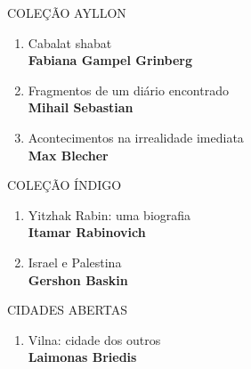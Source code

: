 \pagebreak
\pagestyle{empty}

\begingroup
\fontsize{7}{8}%

\scriptsize
{\formular\large{COLEÇÃO AYLLON}}
\begin{enumerate}
\setlength\parskip{4.2pt}
\setlength\itemsep{-1.4mm}
\item Cabalat shabat\\ \textbf{Fabiana Gampel Grinberg}
\setlength\parskip{8pt}
\item Fragmentos de um diário encontrado\\ \textbf{Mihail Sebastian}
\item Acontecimentos na irrealidade imediata\\ \textbf{Max Blecher}
\end{enumerate}

\scriptsize
{\formular\large{COLEÇÃO ÍNDIGO}}
\begin{enumerate}
\setlength\parskip{4.2pt}
\setlength\itemsep{-1.4mm}
\item Yitzhak Rabin: uma biografia\\ \textbf{Itamar Rabinovich}
\setlength\parskip{8pt}
\item Israel e Palestina\\ \textbf{Gershon Baskin}
\end{enumerate}

\scriptsize
{\formular\large{CIDADES ABERTAS}}
\begin{enumerate}
\setlength\parskip{4.2pt}
\setlength\itemsep{-1.4mm}
\item Vilna: cidade dos outros\\ \textbf{Laimonas Briedis}
\end{enumerate}

\pagebreak